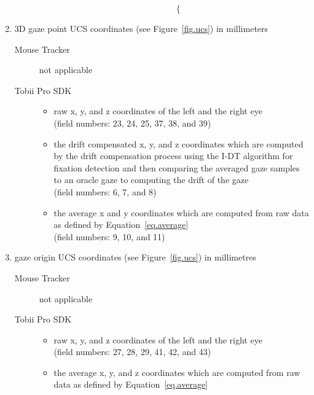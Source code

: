 \documentclass[a4paper,oneside]{book}
\begin{document}
\begin{enumerate}
\begin{description}
\begin{itemize}
\begin{equation}
\begin{cases}
        \end{cases}
\end{equation}
                \end{itemize}
        \end{description}
    \item 3D gaze point UCS coordinates (see Figure~\ref{fig.ucs}) in millimeters
        \begin{description}
            \item[Mouse Tracker] not applicable
            \item[Tobii Pro SDK] \hfill
                \begin{itemize}
                    \item raw x, y, and z coordinates of the left and the right eye\\
                        (field numbers: 23, 24, 25, 37, 38, and 39)
                    \item the drift compensated x, y, and z coordinates which are computed by the drift compensation process using the I-DT algorithm for fixation detection and then comparing the averaged gaze samples to an oracle gaze to computing the drift of the gaze\\
                        (field numbers: 6, 7, and 8)
                    \item the average x and y coordinates which are computed from raw data as defined by Equation~\ref{eq.average}\\
                        (field numbers: 9, 10, and 11)
                \end{itemize}
        \end{description}
    \item gaze origin UCS coordinates (see Figure~\ref{fig.ucs}) in millimetres
        \begin{description}
            \item[Mouse Tracker] not applicable
            \item[Tobii Pro SDK] \hfill
                \begin{itemize}
                    \item raw x, y, and z coordinates of the left and the right eye\\
                        (field numbers: 27, 28, 29, 41, 42, and 43)
                    \item the average x, y, and z coordinates which are computed from raw data as defined by Equation~\ref{eq.average}\\

\end{itemize}
\end{description}
\end{enumerate}
\end{document}
